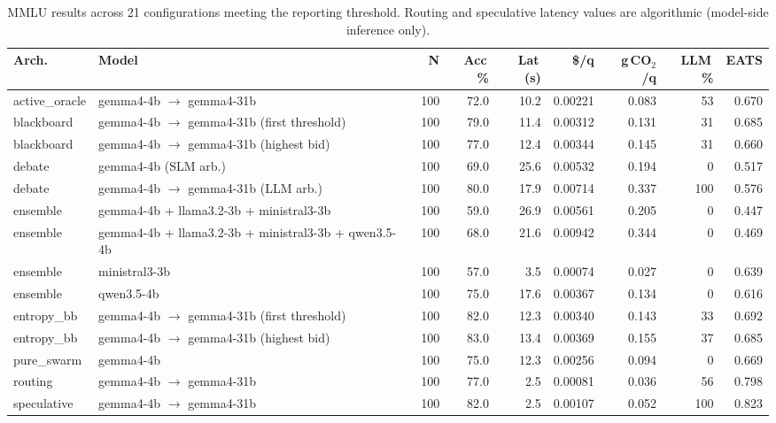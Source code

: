 \begin{table}[htbp]
\centering
\caption{MMLU results across 21 configurations meeting the reporting threshold. Routing and speculative latency values are algorithmic (model-side inference only).}
\label{tab:result-mmlu}
\scriptsize
\renewcommand{\arraystretch}{1.15}
\begin{tabularx}{\linewidth}{@{} l X r r r r r r r @{}}
\toprule
\textbf{Arch.} & \textbf{Model} & \textbf{N} & \textbf{Acc\,\%} & \textbf{Lat\,(s)} & \textbf{\$/q} & \textbf{g\,CO$_2$/q} & \textbf{LLM\,\%} & \textbf{EATS} \\
\midrule
active\_oracle & gemma4-4b $\rightarrow$ gemma4-31b & 100 & 72.0 & 10.2 & 0.00221 & 0.083 & 53 & 0.670 \\
blackboard & gemma4-4b $\rightarrow$ gemma4-31b (first threshold) & 100 & 79.0 & 11.4 & 0.00312 & 0.131 & 31 & 0.685 \\
blackboard & gemma4-4b $\rightarrow$ gemma4-31b (highest bid) & 100 & 77.0 & 12.4 & 0.00344 & 0.145 & 31 & 0.660 \\
debate & gemma4-4b (SLM arb.) & 100 & 69.0 & 25.6 & 0.00532 & 0.194 & 0 & 0.517 \\
debate & gemma4-4b $\rightarrow$ gemma4-31b (LLM arb.) & 100 & 80.0 & 17.9 & 0.00714 & 0.337 & 100 & 0.576 \\
ensemble & gemma4-4b + llama3.2-3b + ministral3-3b & 100 & 59.0 & 26.9 & 0.00561 & 0.205 & 0 & 0.447 \\
ensemble & gemma4-4b + llama3.2-3b + ministral3-3b + qwen3.5-4b & 100 & 68.0 & 21.6 & 0.00942 & 0.344 & 0 & 0.469 \\
ensemble & ministral3-3b & 100 & 57.0 & 3.5 & 0.00074 & 0.027 & 0 & 0.639 \\
ensemble & qwen3.5-4b & 100 & 75.0 & 17.6 & 0.00367 & 0.134 & 0 & 0.616 \\
entropy\_bb & gemma4-4b $\rightarrow$ gemma4-31b (first threshold) & 100 & 82.0 & 12.3 & 0.00340 & 0.143 & 33 & 0.692 \\
entropy\_bb & gemma4-4b $\rightarrow$ gemma4-31b (highest bid) & 100 & 83.0 & 13.4 & 0.00369 & 0.155 & 37 & 0.685 \\
pure\_swarm & gemma4-4b & 100 & 75.0 & 12.3 & 0.00256 & 0.094 & 0 & 0.669 \\
routing & gemma4-4b $\rightarrow$ gemma4-31b & 100 & 77.0 & 2.5 & 0.00081 & 0.036 & 56 & 0.798 \\
speculative & gemma4-4b $\rightarrow$ gemma4-31b & 100 & 82.0 & 2.5 & 0.00107 & 0.052 & 100 & 0.823 \\

\end{tabularx}
\end{table}
